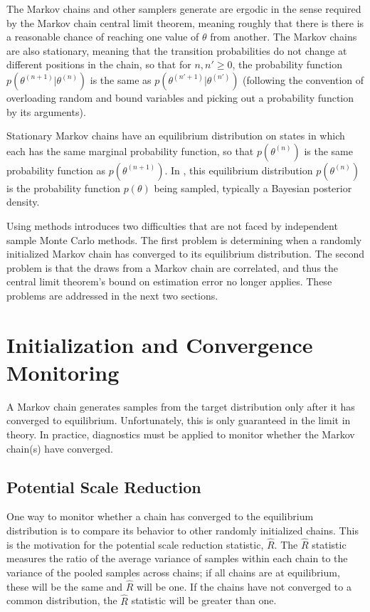 The Markov chains \Stan and other \MCMC samplers generate are ergodic
in the sense required by the Markov chain central limit theorem,
meaning roughly that there is there is a reasonable chance of reaching
one value of $\theta$ from another.  The Markov chains are also
stationary, meaning that the transition probabilities do not change at
different positions in the chain, so that for $n, n' \geq 0$, the
probability function $p(\theta^{(n+1)}|\theta^{(n)})$ is the same as
$p(\theta^{(n'+1)}|\theta^{(n')})$ (following the convention of
overloading random and bound variables and picking out a probability
function by its arguments).

Stationary Markov chains have an equilibrium distribution on states in
which each has the same marginal probability function, so that
$p(\theta^{(n)})$ is the same probability function as
$p(\theta^{(n+1)})$.  In \Stan, this equilibrium distribution
$p(\theta^{(n)})$ is the probability function $p(\theta)$ being
sampled, typically a Bayesian posterior density.

Using \MCMC methods introduces two difficulties that are not faced by
independent sample Monte Carlo methods.  The first problem is determining
when a randomly initialized Markov chain has converged to its
equilibrium distribution.  The second problem is that the draws from a
Markov chain are correlated, and thus the central limit theorem's
bound on estimation error no longer applies.  These problems are
addressed in the next two sections.


\section{Initialization and Convergence Monitoring}\label{convergence.section}

A Markov chain generates samples from the target distribution only
after it has converged to equilibrium.  Unfortunately, this is only
guaranteed in the limit in theory.  In practice, diagnostics must be
applied to monitor whether the Markov chain(s) have converged.

\subsection{Potential Scale Reduction}

One way to monitor whether a chain has converged to the equilibrium
distribution is to compare its behavior to other randomly initialized
chains.  This is the motivation for the \cite{GelmanRubin:1992}
potential scale reduction statistic, $\hat{R}$.  The $\hat{R}$
statistic measures the ratio of the average variance of samples within
each chain to the variance of the pooled samples across chains; if all
chains are at equilibrium, these will be the same and $\hat{R}$ will
be one.  If the chains have not converged to a common distribution,
the $\hat{R}$ statistic will be greater than one.

